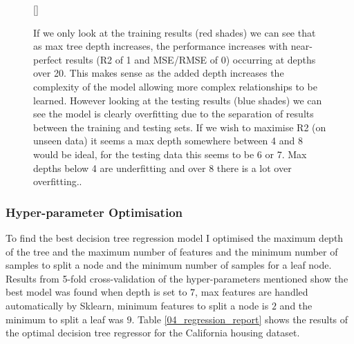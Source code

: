 \documentclass[11pt]{article}
\begin{document}
\begin{figure}[h]
[\FBwidth]
{\caption{If we only look at the training results (red shades) we can see that as max tree depth increases, the performance increases with near-perfect results (R2 of 1 and MSE/RMSE of 0) occurring at depths over 20. This makes sense as the added depth increases the complexity of the model allowing more complex relationships to be learned. However looking at the testing results (blue shades) we can see the model is clearly overfitting due to the separation of results between the training and testing sets. If we wish to maximise R2 (on unseen data) it seems a max depth somewhere between 4 and 8 would be ideal, for the testing data this seems to be 6 or 7. Max depths below 4 are underfitting and over 8 there is a lot over overfitting..}}
{}
\label{decision_tree_depths}
\end{figure}

\subsubsection{Hyper-parameter Optimisation}

To find the best decision tree regression model I optimised the maximum depth of the tree and the maximum number of features and the minimum number of samples to split a node and the minimum number of samples for a leaf node. Results from 5-fold cross-validation of the hyper-parameters mentioned show the best model was found when depth is set to $7$, max features are handled automatically by Sklearn, minimum features to split a node is $2$ and the minimum to split a leaf was $9$. Table \ref{04_regression_report} shows the results of the optimal decision tree regressor for the California housing dataset.
\end{document}
